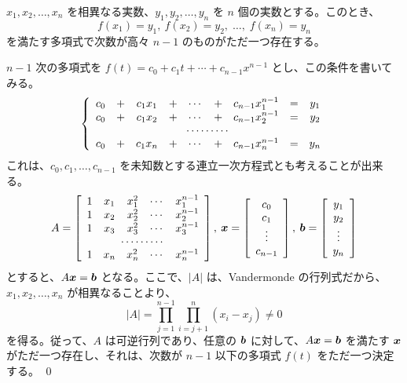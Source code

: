 \begin{prop}
$x_1,x_2,\ldots, x_n$ を相異なる実数、$y_1, y_2, \ldots, y_n$ を $n$ 個の実数とする。このとき、
$$f(x_1) = y_1, \:f(x_2) = y_2, \;\ldots, \;f(x_n) = y_n$$
を満たす多項式で次数が高々 $n-1$ のものがただ一つ存在する。
\end{prop}
\proof
$n-1$ 次の多項式を $f(t) = c_0 + c_1t + \cdots + c_{n-1}x^{n-1}$ とし、この条件を書いてみる。
$$\left\{\begin{array}{ccccccccc}
c_0 & + & c_1x_1 & + & \cdots & + & c_{n-1}x_1^{n-1} & = & y_1\\
c_0 & + & c_1x_2 & + & \cdots & + & c_{n-1}x_2^{n-1} & = & y_2\\
\multicolumn{9}{c}{\cdots\cdots\cdots}\\
c_0 & + & c_1x_n & + & \cdots & + & c_{n-1}x_n^{n-1} & = & y_n
\end{array}\right.$$
これは、$c_0, c_1, \ldots, c_{n-1}$ を未知数とする連立一次方程式とも考えることが出来る。
$$A = \left[\begin{array}{ccccc}1 & x_1 & x_1^2 & \cdots & x_1^{n-1} \\
1 & x_2 & x_2^2 & \cdots & x_2^{n-1}\\1 & x_3 & x_3^2 & \cdots & x_3^{n-1} \\\multicolumn{5}{c}{\cdots\cdots\cdots} \\1 & x_n & x_n^2 & \cdots & x_n^{n-1}
\end{array}\right],\:\bx = \left[\begin{array}{c}c_0\\c_1\\ \vdots\\ c_{n-1}\end{array}\right],\:\bb = \left[\begin{array}{c}y_1\\y_2\\ \vdots\\ y_n\end{array}\right]$$
とすると、$A\mbox{\boldmath $x$} = \mbox{\boldmath $b$}$ となる。ここで、$|A|$ は、Vandermonde の行列式だから、\\
$x_1, x_2, \ldots, x_n$ が相異なることより、
$$|A| = \prod_{j = 1}^{n-1}\prod_{i = j+1}^{n}(x_i - x_j) \neq 0$$
を得る。従って、$A$ は可逆行列であり、任意の $\mbox{\boldmath $b$}$ に対して、$A\mbox{\boldmath $x$} = \mbox{\boldmath $b$}$ を満たす $\mbox{\boldmath $x$}$ がただ一つ存在し、それは、次数が $n-1$ 以下の多項式 $f(t)$ をただ一つ決定する。
\qed

